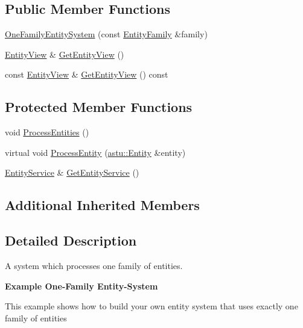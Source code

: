 \subsection*{Public Member Functions}
\begin{DoxyCompactItemize}
\item 
\hyperlink{classastu_1_1OneFamilyEntitySystem_a97f5065181149d2651366867a3ffd884}{One\+Family\+Entity\+System} (const \hyperlink{classastu_1_1EntityFamily}{Entity\+Family} \&family)
\item 
\hyperlink{group__ecs__group_gace2fb790b86c3908a65e4222f7ac2f4e}{Entity\+View} \& \hyperlink{classastu_1_1OneFamilyEntitySystem_a1d4106716b7298b177615884ffa62f6c}{Get\+Entity\+View} ()
\item 
const \hyperlink{group__ecs__group_gace2fb790b86c3908a65e4222f7ac2f4e}{Entity\+View} \& \hyperlink{classastu_1_1OneFamilyEntitySystem_ae39a5715e61036ef73a18a995c21ab10}{Get\+Entity\+View} () const
\end{DoxyCompactItemize}
\subsection*{Protected Member Functions}
\begin{DoxyCompactItemize}
\item 
void \hyperlink{classastu_1_1OneFamilyEntitySystem_a6d2343f720abd99abe1f41f7601776f5}{Process\+Entities} ()
\item 
virtual void \hyperlink{classastu_1_1OneFamilyEntitySystem_ad91b51933676ed72e45142e98ca27025}{Process\+Entity} (\hyperlink{classastu_1_1Entity}{astu\+::\+Entity} \&entity)
\item 
\hyperlink{classastu_1_1EntityService}{Entity\+Service} \& \hyperlink{classastu_1_1OneFamilyEntitySystem_a7ad12fc482483a0c895baa8636d49fe0}{Get\+Entity\+Service} ()
\end{DoxyCompactItemize}
\subsection*{Additional Inherited Members}


\subsection{Detailed Description}
A system which processes one family of entities.

{\bfseries Example One-\/\+Family Entity-\/\+System}

This example shows how to build your own entity system that uses exactly one family of entities

